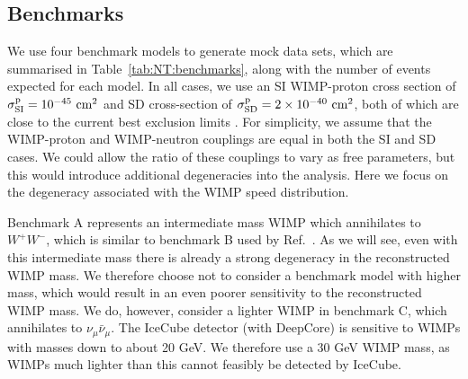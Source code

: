 \subsection{Benchmarks}
\label{sec:NT:benchmarks}
We use four benchmark models to generate mock data sets, which are summarised in Table~\ref{tab:NT:benchmarks}, along with the number of events expected for each model. In all cases, we use an SI WIMP-proton cross section of $\sigmapsi = 10^{-45} \textrm{ cm}^2$ and SD cross-section of $\sigmapsd = 2 \times 10^{-40} \textrm{ cm}^2$, both of which are close to the current best exclusion limits \cite{Akerib:2014, Behnke:2012}. For simplicity, we assume that the WIMP-proton and WIMP-neutron couplings are equal in both the SI and SD cases. We could allow the ratio of these couplings to vary as free parameters, but this would introduce additional degeneracies into the analysis. Here we focus on the degeneracy associated with the WIMP speed distribution.

Benchmark A represents an intermediate mass WIMP which annihilates to $W^{+}W^{-}$, which is similar to benchmark B used by Ref.~\cite{Arina:2013}. As we will see, even with this intermediate mass there is already a strong degeneracy in the reconstructed WIMP mass. We therefore choose not to consider a benchmark model with higher mass, which would result in an even poorer sensitivity to the reconstructed WIMP mass. We do, however, consider a lighter WIMP in benchmark C, which annihilates to $\nu_\mu \bar{\nu}_\mu$. The IceCube detector (with DeepCore) is sensitive to WIMPs with masses down to about 20 GeV. We therefore use a 30 GeV WIMP mass, as WIMPs much lighter than this cannot feasibly be detected by IceCube.

